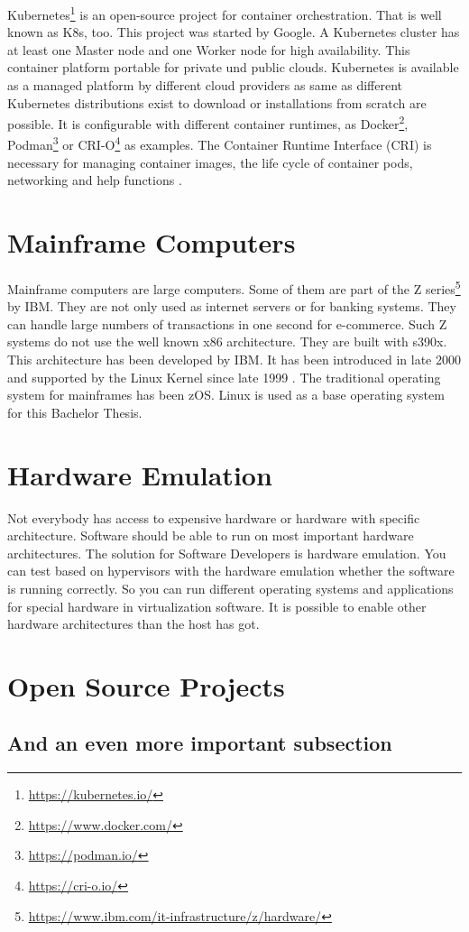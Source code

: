 Kubernetes\footnote{\url{https://kubernetes.io/}} is an open-source project for container orchestration. That is well known as K8s, too. This project was started by Google. A Kubernetes cluster has at least one Master node and one Worker node for high availability. This container platform portable for private und public clouds. Kubernetes is available as a managed platform by different cloud providers as same as different Kubernetes distributions exist to download or installations from scratch are possible. It is configurable with different container runtimes, as Docker\footnote{\url{https://www.docker.com/}}, Podman\footnote{\url{https://podman.io/}} or CRI-O\footnote{\url{https://cri-o.io/}} as examples. The Container Runtime Interface (CRI) is necessary for managing container images, the life cycle of container pods, networking and help functions \cite[~p.16]{Scholl2019}. 
\blindtext

\section{Mainframe Computers}

Mainframe computers are large computers. Some of them are part of the Z series\footnote{\url{https://www.ibm.com/it-infrastructure/z/hardware/}} by IBM. They are not only used as internet servers or for banking systems. They can handle large numbers of transactions in one second for e-commerce\cite[~p.56]{Tanenbaum2014}. Such Z systems do not use the well known x86 architecture. They are built with s390x. This architecture has been developed by IBM. It has been introduced in late 2000 and supported by the Linux Kernel since late 1999 \cite[~p.15]{Block2019}. The traditional operating system for mainframes has been z\/OS. Linux is used as a base operating system for this Bachelor Thesis.


\blindtext

\section{Hardware Emulation}

Not everybody has access to expensive hardware or hardware with  specific architecture. Software should be able to run on most important hardware architectures. The solution for Software Developers is hardware emulation. You can test based on hypervisors with the hardware emulation whether the software is running correctly. So you can run different operating systems and applications for special hardware in virtualization software. It is possible to enable other hardware architectures than the host has got.
\blindtext

\section{Open Source Projects}
\blindtext

\subsection{And an even more important subsection}
\blindtext
